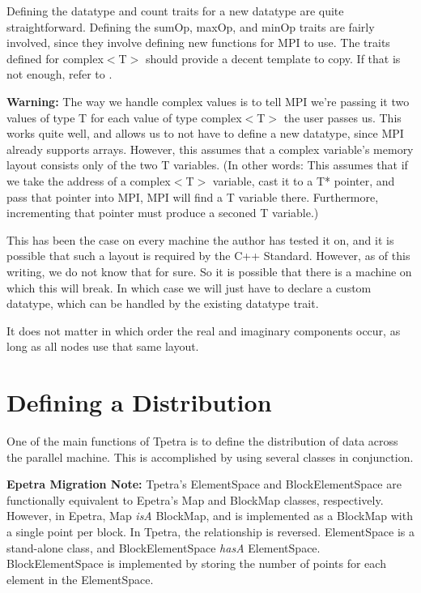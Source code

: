 \documentclass[10pt,relax]{TpetraDesign}
\begin{document}
Defining the datatype and count traits for a new datatype are quite straightforward. Defining the sumOp, maxOp, and minOp traits are fairly involved, since they involve defining new functions for MPI to use. The traits defined for complex$<$T$>$ should provide a decent template to copy. If that is not enough, refer to \cite{MPI}.

\textbf{Warning:} The way we handle complex values is to tell MPI we're passing it two values of type T for each value of type complex$<$T$>$ the user passes us. This works quite well, and allows us to not have to define a new datatype, since MPI already supports arrays. However, this assumes that a complex variable's memory layout consists only of the two T variables. (In other words: This assumes that if we take the address of a complex$<$T$>$ variable, cast it to a T* pointer, and pass that pointer into MPI, MPI will find a T variable there. Furthermore, incrementing that pointer must produce a seconed T variable.) 

This has been the case on every machine the author has tested it on, and it is possible that such a layout is required by the C++ Standard. However, as of this writing, we do not know that for sure. So it is possible that there is a machine on which this will break. In which case we will just have to declare a custom datatype, which can be handled by the existing datatype trait.

It does not matter in which order the real and imaginary components occur, as long as all nodes use that same layout.

%
\section{Defining a Distribution}
One of the main functions of Tpetra is to define the distribution of data across the parallel machine. This is accomplished by using several classes in conjunction.

\textbf{Epetra Migration Note:} Tpetra's ElementSpace and BlockElementSpace are functionally equivalent to Epetra's Map and BlockMap classes, respectively. However, in Epetra, Map \emph{isA} BlockMap, and is implemented as a BlockMap with a single point per block. In Tpetra, the relationship is reversed. ElementSpace is a stand-alone class, and BlockElementSpace \emph{hasA} ElementSpace. BlockElementSpace is implemented by storing the number of points for each element in the ElementSpace.
\end{document}
